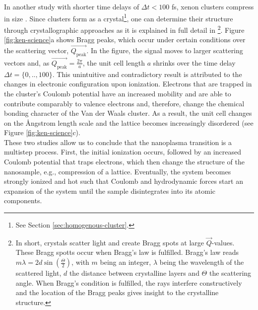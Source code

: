 In another study with shorter time delays of $\Delta t<100$ fs, xenon clusters compress in size \citep{Ferguson-2016-SciAdv}. Since clusters form as a crystal\footnote{See Section \ref{sec:homogenous-cluster}.}, one can determine their structure through crystallographic approaches as it is explained in full detail in \citep[][chapter 5]{Als-Nielson-2011-JWS}\footnote{In short, crystals scatter light and create Bragg spots at large $\vec{Q}$-values. These Bragg spotts occur when Bragg's law is fulfilled. Bragg's law reads $m \lambda = 2d \sin\left(\frac{\Theta}{2}\right)$, with $m$ being an integer, $\lambda$ being the wavelength of the scattered light, $d$ the distance between crystalline layers and $\Theta$ the scattering angle. When Bragg's condition is fulfilled, the rays interfere constructively and the location of the Bragg peaks gives insight to the crystalline structure.}. Figure \ref{fig:ken-science}a shows Bragg peaks, which occur under certain conditions over the scattering vector, $\vec{Q_{\text{peak}}}$. In the figure, the signal moves to larger scattering vectors and, as $\vec{Q_{\text{peak}}}=\frac{2\pi}{a}$, the unit cell length $a$ shrinks over the time delay $\Delta t = \{0,..,100\}$. This unintuitive and contradictory result is attributed to the changes in electronic configuration upon ionization. Electrons that are trapped in the cluster's Coulomb potential have an increased mobility and are able to contribute comparably to valence electrons and, therefore, change the chemical bonding character of the Van der Waals cluster. As a result, the unit cell changes on the {\AA}ngstrom length scale and the lattice becomes increasingly disordered (see Figure \ref{fig:ken-science}c).\\[1\baselineskip]
These two studies allow us to conclude that the nanoplasma transition is a multistep process. First, the initial ionization occurs, followed by an increased Coulomb potential that traps electrons, which then change the structure of the nanosample, e.g., compression of a lattice. Eventually, the system becomes strongly ionized and hot such that Coulomb and hydrodynamic forces start an expansion of the system until the sample disintegrates into its atomic components.
%
%
%
